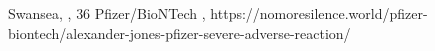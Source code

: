           {Swansea, , }
          {36}
          {Pfizer/BioNTech}
          {, }
          {
          }
          {https://nomoresilence.world/pfizer-biontech/alexander-jones-pfizer-severe-adverse-reaction/}
